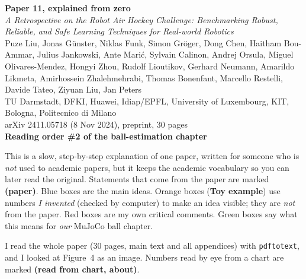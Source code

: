 \documentclass[11pt,a4paper]{article}
\begin{document}
\setcounter{tocdepth}{1}

\begin{center}
{\LARGE\bfseries\color{cblue} Paper 11, explained from zero}\\[0.6em]
{\large \textit{A Retrospective on the Robot Air Hockey Challenge: Benchmarking Robust,
Reliable, and Safe Learning Techniques for Real-world Robotics}}\\[0.5em]
Puze Liu, Jonas G\"unster, Niklas Funk, Simon Gr\"oger, Dong Chen, Haitham Bou-Ammar,
Julius Jankowski, Ante Mari\'c, Sylvain Calinon, Andrej Orsula, Miguel Olivares-Mendez,
Hongyi Zhou, Rudolf Lioutikov, Gerhard Neumann, Amarildo Likmeta, Amirhossein Zhalehmehrabi,
Thomas Bonenfant, Marcello Restelli, Davide Tateo, Ziyuan Liu, Jan Peters\\
TU Darmstadt, DFKI, Huawei, Idiap/EPFL, University of Luxembourg, KIT, Bologna, Politecnico di Milano\\
arXiv 2411.05718 (8 Nov 2024), preprint, 30 pages\\[0.4em]
\textbf{Reading order \#2 of the ball-estimation chapter}
\end{center}

\begin{idea}
This is a slow, step-by-step explanation of one paper, written for someone who is \emph{not}
used to academic papers, but it keeps the academic vocabulary so you can later read the
original. Statements that come from the paper are marked \textbf{(paper)}. Blue boxes are the
main ideas. Orange boxes (\textbf{Toy example}) use numbers \emph{I invented} (checked by
computer) to make an idea visible; they are \emph{not} from the paper. Red boxes are my own
critical comments. Green boxes say what this means for \emph{our} MuJoCo ball chapter.

I read the whole paper (30 pages, main text and all appendices) with \texttt{pdftotext}, and I
looked at Figure~4 as an image. Numbers read by eye from a chart are marked
\textbf{(read from chart, about)}.
\end{idea}
\end{document}
